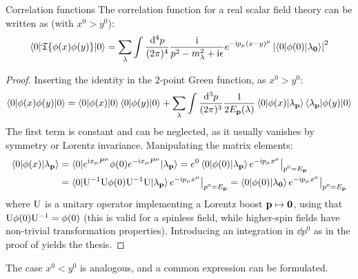 \begin{proposition}{Correlation functions}{}
  The correlation function for a real scalar field theory can be written as (with $ x^0 > y^0 $):
  \begin{equation}
    \braket{0 | \mathfrak{T}\{\phi(x) \phi(y)\} | 0} = \sum_\lambda \int \frac{\mathrm{d}^4p}{(2\pi)^4} \frac{\mathrm{i}}{p^2 - m_\lambda^2 + \mathrm{i}\epsilon} e^{-\mathrm{i} p_\mu (x - y)^\mu} \left\lvert\braket{0 | \phi(0) | \lambda_{\mathbf{0}}}\right\rvert^2
  \end{equation}
\end{proposition}

\begin{proofbox}
  \begin{proof}
    Inserting the identity in the $ 2 $-point Green function, as $ x^0 > y^0 $:
    \begin{equation*}
      \braket{0 | \phi(x) \phi(y) | 0} = \braket{0 | \phi(x) | 0} \braket{0 | \phi(y) | 0} +  \sum_\lambda \int \frac{\mathrm{d}^3p}{(2\pi)^3} \frac{1}{2E_{\mathbf{p}}(\lambda)} \braket{0 | \phi(x) | \lambda_{\mathbf{p}}} \braket{\lambda_{\mathbf{p}} | \phi(y) | 0}
    \end{equation*}
    The first term is constant and can be neglected, as it usually vanishes by symmetry or Lorentz invariance. Manipulating the matrix elements:
    \begin{equation*}
      \begin{split}
        \braket{0 | \phi(x) | \lambda_{\mathbf{p}}}
        & = \braket{0 | e^{\mathrm{i} x_\mu P^\mu} \phi(0) e^{-\mathrm{i} x_\mu P^\mu} | \lambda_{\mathbf{p}}} = e^0 \braket{0 | \phi(0) | \lambda_{\mathbf{p}}} e^{-\mathrm{i} p_\mu x^\mu} \big\vert_{p^0 = E_{\mathbf{p}}} \\
        & = \braket{0 | \mathrm{U}^{-1} \mathrm{U} \phi(0) \mathrm{U}^{-1} \mathrm{U} | \lambda_{\mathbf{p}}} e^{-\mathrm{i} p_\mu x^\mu} \big\vert_{p^0 = E_{\mathbf{p}}} = \braket{0 | \phi(0) | \lambda_{\mathbf{0}}} e^{-\mathrm{i} p_\mu x^\mu} \big\vert_{p^0 = E_{\mathbf{p}}}
      \end{split}
    \end{equation*}
    where $ \mathrm{U} $ is a unitary operator implementing a Lorentz boost $ \mathbf{p} \mapsto \mathbf{0} $, using that $ \mathrm{U} \phi(0) \mathrm{U}^{-1} = \phi(0) $ (this is valid for a spinless field, while higher-spin fields have non-trivial transformation properties). Introducing an integration in $ \dd p^0 $ as in the proof of  yields the thesis.
  \end{proof}
\end{proofbox}

The case $ x^0 < y^0 $ is analogous, and a common expression can be formulated.

